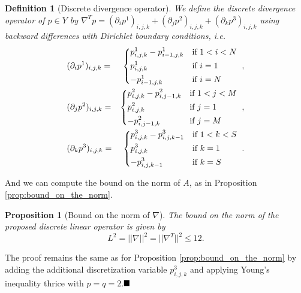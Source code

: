\documentclass[abstracton]{scrreprt}
\newcommand{\qed}{$\hfill\blacksquare$}
\newtheorem{proposition}[theorem]{Proposition}
\newtheorem{definition}[theorem]{Definition}
\newenvironment{proof}[1][Proof]{\begin{trivlist}
\item[\hskip \labelsep {\bfseries #1}]}{\end{trivlist}}
\begin{document}
        \begin{definition}[Discrete divergence operator] %
        \label{def:discrete_divergence_operator_ms}
            We define the discrete divergence operator of $p \in Y$ by $\nabla^{T} p = (\partial_{i}p^{1})_{i, j, k} + (\partial_{j}p^{2})_{i, j, k} + (\partial_{k}p^{3})_{i, j, k}$ using backward differences with Dirichlet boundary conditions, i.e.
                \begin{eqnarray}
                    &(\partial_{i}p^{1})_{i, j, k} =&
                        \begin{dcases*}
                            p^{1}_{i, j, k} - p^{1}_{i-1, j, k} & \textnormal{if $1 < i < N$} \\
                            p^{1}_{i, j, k} & \textnormal{if $i = 1$} \\
                            -p^{1}_{i-1, j, k} & \textnormal{if $i = N$}
                        \end{dcases*},
                    \notag \\
                    &(\partial_{j}p^{2})_{i, j, k} =&
                        \begin{dcases*}
                            p^{2}_{i, j, k} - p^{2}_{i, j-1, k} & \textnormal{if $1 < j < M$} \\
                            p^{2}_{i, j, k} & \textnormal{if $j = 1$} \\
                            -p^{2}_{i, j-1, k} & \textnormal{if $j = M$}
                        \end{dcases*},
                    \notag \\
                    &(\partial_{k}p^{3})_{i, j, k} =&
                        \begin{dcases*}
                            p^{3}_{i, j, k} - p^{3}_{i, j, k-1} & \textnormal{if $1 < k < S$} \\
                            p^{3}_{i, j, k} & \textnormal{if $k = 1$} \\
                            -p^{3}_{i, j, k-1} & \textnormal{if $k = S$}
                        \end{dcases*}.
                    \notag
                \end{eqnarray}
        \end{definition}
        And we can compute the bound on the norm of $A$, as in Proposition \ref{prop:bound_on_the_norm}.
        \begin{proposition}[Bound on the norm of $\nabla$] %
            \label{prop:bound_on_the_norm_ms}
            The bound on the norm of the proposed discrete linear operator is given by
                $$
                    L^{2} = ||\nabla||^{2} = ||\nabla^{T}||^{2} \le 12.
                $$
        \end{proposition}
        \begin{proof}
        	The proof remains the same as for Proposition \ref{prop:bound_on_the_norm} by adding the additional discretization variable $p^{3}_{i,j,k}$ and applying Young's inequality thrice with $p = q = 2$.\qed
        \end{proof}
\end{document}
